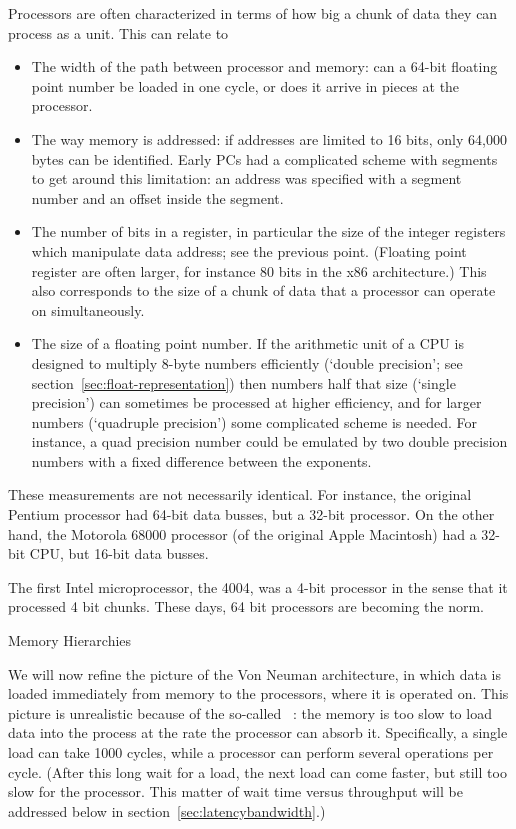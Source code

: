 Processors are often characterized in terms of how big a chunk of data
they can process as a unit. This can relate to
\begin{itemize}
\item The width of the path between processor and memory: can a 64-bit
  floating point number be loaded in one cycle, or does it arrive in
  pieces at the processor.
\item The way memory is addressed: if addresses are limited to 16
  bits, only 64,000 bytes can be identified. Early PCs had a
  complicated scheme with segments to get around this limitation: an
  address was specified with a segment number and an offset inside the segment.
\item The number of bits in a register, in particular the size of the
  integer registers which manipulate data address; see the previous
  point. (Floating point register are often larger, for instance 80
  bits in the x86 architecture.) This also corresponds to the size of
  a chunk of data that a processor can operate on simultaneously.
\item The size of a floating point number. If the arithmetic unit of a
  CPU is designed to multiply 8-byte numbers efficiently (`double
  precision'; see section~\ref{sec:float-representation}) then numbers half
  that size (`single precision') can sometimes be processed at higher
  efficiency, and for larger numbers (`quadruple precision') some
  complicated scheme is needed. For instance, a quad precision number
  could be emulated by two double precision numbers with a fixed
  difference between the exponents.
\end{itemize}
These measurements are not necessarily identical. For instance, the
original Pentium processor had 64-bit data busses, but a 32-bit
processor. On the other hand, the Motorola 68000 processor (of the
original Apple Macintosh) had a 32-bit CPU, but 16-bit data busses.

The first Intel microprocessor, the 4004, was a 4-bit
processor in the sense that it processed 4 bit chunks. These days,
64 bit processors are becoming the norm.

 {Memory Hierarchies}
\label{sec:hierarchy}

We will now refine the picture of the Von Neuman architecture, in
which data is loaded immediately from memory to the processors, where
it is operated on. This picture is unrealistic because of the
so-called ~\cite{Wulf:memory-wall}: the
memory is too slow to load data into the process at the rate the
processor can absorb it. Specifically, a single load can take 1000
cycles, while a processor can perform several operations per
cycle. (After this long wait for a load, the next load can come
faster, but still too slow for the processor. This matter of wait time
versus throughput will be addressed below in
section~\ref{sec:latencybandwidth}.)

